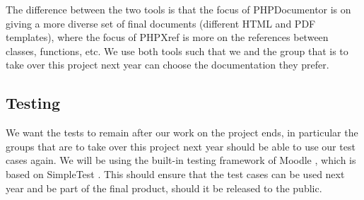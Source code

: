 The difference between the two tools is that the focus of PHPDocumentor is on giving a more diverse set of final documents (different HTML and PDF templates), where the focus of PHPXref is more on the references between classes, functions, etc.
We use both tools such that we and the group that is to take over this project next year can choose the documentation they prefer.


\subsection{Testing}
\label{sub:testing}
We want the tests to remain after our work on the project ends, in particular the groups that are to take over this project next year should be able to use our test cases again.
We will be using the built-in testing framework of Moodle \cite{moodletest}, which is based on SimpleTest \cite{simpletest}.
This should ensure that the test cases can be used next year and be part of the final product, should it be released to the public.